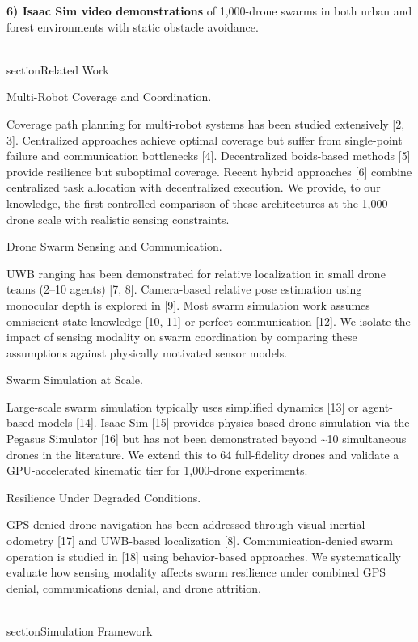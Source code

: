 \documentclass[conference]{IEEEtran}
\begin{document}
\textbf{6) Isaac Sim video demonstrations} of 1,000-drone swarms in both
urban and forest environments with static obstacle avoidance.

\\section{Related Work}\label{ii.-related-work}

Multi-Robot Coverage and Coordination.

Coverage path planning for multi-robot systems has been studied
extensively {[}2, 3{]}. Centralized approaches achieve optimal coverage
but suffer from single-point failure and communication bottlenecks
[4]. Decentralized boids-based methods [5] provide resilience
but suboptimal coverage. Recent hybrid approaches [6] combine
centralized task allocation with decentralized execution. We provide, to
our knowledge, the first controlled comparison of these architectures at
the 1,000-drone scale with realistic sensing constraints.

Drone Swarm Sensing and Communication.

UWB ranging has been demonstrated for relative localization in small
drone teams (2--10 agents) {[}7, 8{]}. Camera-based relative pose
estimation using monocular depth is explored in [9]. Most swarm
simulation work assumes omniscient state knowledge {[}10, 11{]} or
perfect communication [12]. We isolate the impact of sensing
modality on swarm coordination by comparing these assumptions against
physically motivated sensor models.

Swarm Simulation at Scale.

Large-scale swarm simulation typically uses simplified dynamics [13]
or agent-based models [14]. Isaac Sim [15] provides
physics-based drone simulation via the Pegasus Simulator [16] but
has not been demonstrated beyond \textasciitilde10 simultaneous drones
in the literature. We extend this to 64 full-fidelity drones and
validate a GPU-accelerated kinematic tier for 1,000-drone experiments.

Resilience Under Degraded Conditions.

GPS-denied drone navigation has been addressed through visual-inertial
odometry [17] and UWB-based localization [8].
Communication-denied swarm operation is studied in [18] using
behavior-based approaches. We systematically evaluate how sensing
modality affects swarm resilience under combined GPS denial,
communications denial, and drone attrition.

\\section{Simulation Framework}\label{iii.-simulation-framework}
\end{document}
